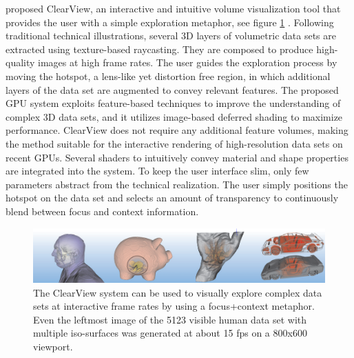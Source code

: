   
\cite{4015450} proposed ClearView, an interactive and intuitive volume
visualization tool that provides the user with a simple exploration
metaphor, see figure \ref{fig:clearview} . Following traditional technical illustrations, several 3D
layers of volumetric data sets are extracted using texture-based raycasting.
They are composed to produce high-quality images at high
frame rates. The user guides the exploration process by moving the
hotspot, a lens-like yet distortion free region, in which additional layers
of the data set are augmented to convey relevant features. The proposed
GPU system exploits feature-based techniques to improve the
understanding of complex 3D data sets, and it utilizes image-based
deferred shading to maximize performance. ClearView does not require
any additional feature volumes, making the method suitable for
the interactive rendering of high-resolution data sets on recent GPUs.
Several shaders to intuitively convey material and shape properties are
integrated into the system. To keep the user interface slim, only few
parameters abstract from the technical realization. The user simply
positions the hotspot on the data set and selects an amount of transparency
to continuously blend between focus and context information.
\begin{figure}
\centering
\includegraphics[width=\textwidth]{Figures/clearview}
\decoRule
\caption[ clearview]{ The ClearView system can be used to visually explore complex data sets at interactive frame rates by using a focus+context metaphor. Even the leftmost image
of the 5123 visible human data set with multiple iso-surfaces was generated at about 15 fps on a 800x600 viewport.}
\label{fig:clearview}
\end{figure}

